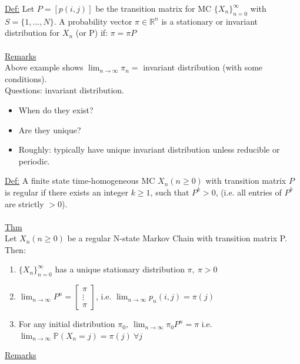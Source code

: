 \documentclass[12pt, letterpaper]{article}
\begin{document}
\underline{Def:} Let $P = [p(i,j)]$ be the transition matrix for MC $\{X_n\}^\infty_{n=0}$ with 
$S = \{1,...,N\}$. A probability vector $\pi \in \mathbb{R}^n$ is a stationary or 
invariant distribution for $X_n$ (or P) if: $\pi = \pi P$ \\ \\
\underline{Remarks} \\
Above example shows $\lim_{n\rightarrow\infty} \pi_n = $ invariant distribution 
(with some conditions). \\ 

\noindent Questions: invariant distribution.
\begin{itemize}
    \item When do they exist?
    \item Are they unique?
    \item Roughly: typically have unique invariant distribution unless reducible or periodic.
\end{itemize}
\noindent \underline{Def:} A finite state time-homogeneous MC $X_n (n \ge 0)$ with transition matrix $P$ is
regular if there exists an integer $k\ge 1$, such that $P^k > 0$, (i.e. all entries of $P^k$ are 
strictly $>0$).  \\ \\
\underline{Thm} \\
Let $X_n (n\ge 0)$ be a regular N-state Markov Chain with transition matrix P. Then:
\begin{enumerate}
    \item $\{X_n\}_{n=0}^\infty$ has a unique stationary distribution $\pi,\ \pi > 0$
    \item $\lim_{n \rightarrow\infty} P^n = \begin{bmatrix}
        \pi \\ \vdots \\ \pi
    \end{bmatrix}$, i.e. $\lim_{n\rightarrow\infty}p_n(i,j) = \pi(j)$
    \item For any initial distribution $\pi_0,\ \lim_{n\rightarrow\infty} \pi_0 P^n = \pi$
    i.e. $\lim_{n\rightarrow\infty} \mathbb{P}(X_n=j)= \pi(j)\ \forall j$
\end{enumerate}
\underline{Remarks}
\end{document}
